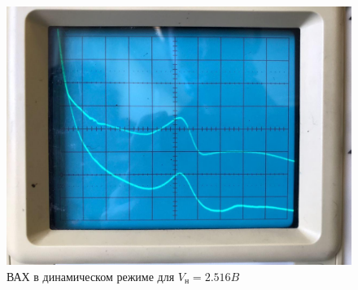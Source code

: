 \documentclass[reprint, nofootinbib, nobalancelastpage, 10pt]{revtex4-2}
\begin{document}
\begin{figure}[h!]
	\includegraphics[width = \linewidth]{vah2.jpg}
	\caption{ВАХ в динамическом режиме для $V_{\text{н}} = 2.516 B$}
	\label{graph:dinvah2}
\end{figure}
\end{document}
